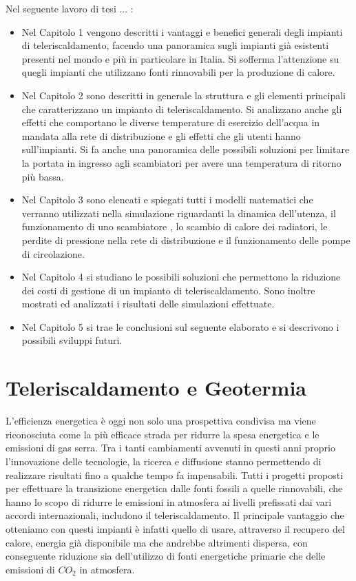 \documentclass[laurea,oneside,11pt]{USiena_tesiLM}
\begin{document}
Nel seguente lavoro di tesi  ... :
\begin{itemize}
\item[]Nel Capitolo 1 vengono descritti i vantaggi e benefici generali degli impianti di  teleriscaldamento, facendo una panoramica sugli impianti già esistenti presenti nel mondo e più in particolare in Italia. Si sofferma l'attenzione su quegli impianti che utilizzano fonti rinnovabili per la produzione di calore.\\

\item[]Nel Capitolo 2  sono descritti in generale la struttura e gli elementi principali che caratterizzano un impianto di teleriscaldamento. Si analizzano anche gli effetti che comportano le diverse temperature di esercizio dell'acqua in mandata alla rete di distribuzione e gli effetti che gli utenti hanno sull'impianti. Si fa anche una panoramica delle possibili soluzioni per limitare la portata in ingresso agli scambiatori per avere una temperatura di ritorno più bassa.

\item[]Nel Capitolo 3 sono elencati e spiegati tutti i modelli matematici  che verranno utilizzati nella simulazione riguardanti la dinamica dell'utenza, il funzionamento di uno scambiatore , lo scambio di calore dei radiatori, le perdite di pressione nella rete di distribuzione e il funzionamento delle pompe di circolazione.

\item[]Nel Capitolo 4 si studiano le possibili soluzioni che permettono la riduzione dei costi di gestione di un impianto di teleriscaldamento. Sono inoltre mostrati ed analizzati i risultati delle simulazioni effettuate.

\item[]Nel Capitolo 5 si trae le conclusioni sul seguente elaborato e si descrivono i possibili sviluppi futuri. 

\end{itemize}
\chapter{Teleriscaldamento e Geotermia}
L'efficienza energetica è oggi non solo una prospettiva condivisa ma viene riconosciuta come la più efficace strada per ridurre la spesa energetica e le emissioni di gas serra. Tra i tanti cambiamenti avvenuti in questi anni proprio l'innovazione delle tecnologie, la ricerca e diffusione stanno permettendo di realizzare risultati fino a qualche tempo fa impensabili. Tutti i progetti proposti per effettuare la transizione energetica dalle fonti fossili a quelle rinnovabili, che hanno lo scopo di ridurre le emissioni in atmosfera ai livelli prefissati dai vari accordi internazionali, includono il teleriscaldamento.
Il principale vantaggio che otteniamo con questi impianti è infatti quello di usare, attraverso il recupero del calore, energia già disponibile ma che andrebbe altrimenti dispersa, con conseguente riduzione sia dell'utilizzo di fonti energetiche primarie che delle emissioni di $CO_2$ in atmosfera.\\
\end{document}
